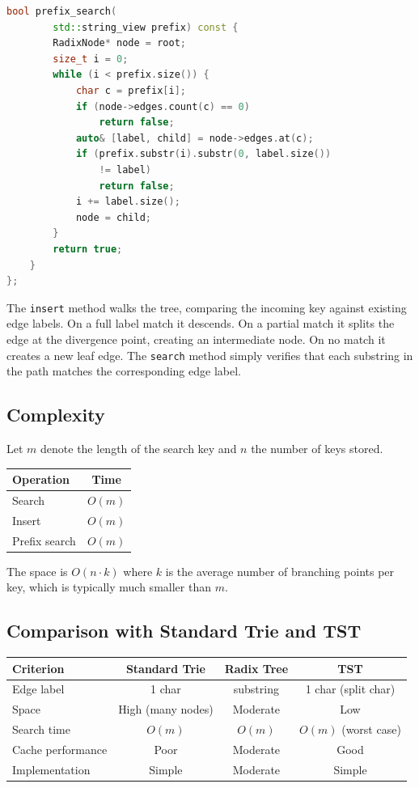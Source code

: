 \begin{lstlisting}[language=C++]
    bool prefix_search(
        std::string_view prefix) const {
        RadixNode* node = root;
        size_t i = 0;
        while (i < prefix.size()) {
            char c = prefix[i];
            if (node->edges.count(c) == 0)
                return false;
            auto& [label, child] = node->edges.at(c);
            if (prefix.substr(i).substr(0, label.size())
                != label)
                return false;
            i += label.size();
            node = child;
        }
        return true;
    }
};
\end{lstlisting}

\noindent
The \texttt{insert} method walks the tree, comparing the incoming key against existing edge labels. On a full label match it descends. On a partial match it splits the edge at the divergence point, creating an intermediate node. On no match it creates a new leaf edge. The \texttt{search} method simply verifies that each substring in the path matches the corresponding edge label.

\subsection{Complexity}

Let $m$ denote the length of the search key and $n$ the number of keys stored.

\begin{center}
\begin{tabular}{lc}
\toprule
Operation & Time \\
\midrule
Search & $O(m)$ \\
Insert & $O(m)$ \\
Prefix search & $O(m)$ \\
\bottomrule
\end{tabular}
\end{center}

\noindent
The space is $O(n \cdot k)$ where $k$ is the average number of branching points per key, which is typically much smaller than $m$.

\subsection{Comparison with Standard Trie and TST}

\begin{center}
\begin{tabular}{lccc}
\toprule
Criterion & Standard Trie & Radix Tree & TST \\
\midrule
Edge label & 1 char & substring & 1 char (split char) \\
Space & High (many nodes) & Moderate & Low \\
Search time & $O(m)$ & $O(m)$ & $O(m)$ (worst case) \\
Cache performance & Poor & Moderate & Good \\
Implementation & Simple & Moderate & Simple \\
\bottomrule
\end{tabular}
\end{center}

